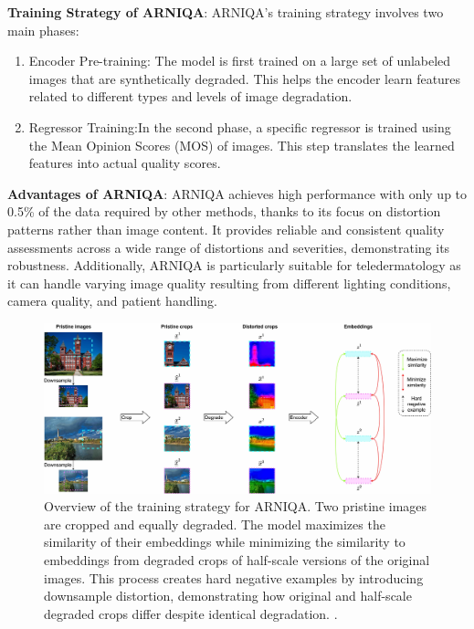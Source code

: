 \vspace{\baselineskip}
\noindent
\textbf{Training Strategy of ARNIQA}: ARNIQA’s training strategy involves two main phases: \par
\begin{enumerate}
    \item Encoder Pre-training: The model is first trained on a large set of unlabeled images that are synthetically degraded. This helps the encoder learn features related to different types and levels of image degradation.
    \item Regressor Training:In the second phase, a specific regressor is trained using the Mean Opinion Scores (MOS) of images. This step translates the learned features into actual quality scores.
\end{enumerate}
\vspace{\baselineskip}
\noindent
\textbf{Advantages of ARNIQA}: ARNIQA achieves high performance with only up to 0.5\% of the data required by other methods, thanks to its focus on distortion patterns rather than image content. It provides reliable and consistent quality assessments across a wide range of distortions and severities, demonstrating its robustness. Additionally, ARNIQA is particularly suitable for teledermatology as it can handle varying image quality resulting from different lighting conditions, camera quality, and patient handling. \par
\begin{figure}[ht]
    \centering
    \includegraphics[keepaspectratio,width=15cm]{img/method_SimCLR.jpg}
    \caption{Overview of the training strategy for ARNIQA. Two pristine images are cropped and equally degraded. The model maximizes the similarity of their embeddings while minimizing the similarity to embeddings from degraded crops of half-scale versions of the original images. This process creates hard negative examples by introducing downsample distortion, demonstrating how original and half-scale degraded crops differ despite identical degradation. \autocite{ARNIQA}.}
    \label{fig:SimCLR}
\end{figure}

